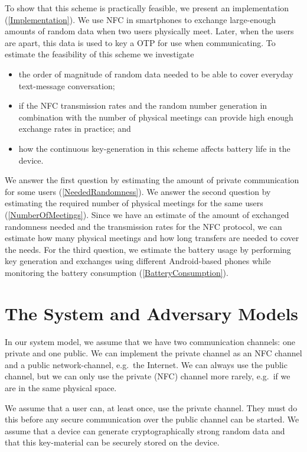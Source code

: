To show that this scheme is practically feasible, we present an implementation 
(\cref{Implementation}).
We use \ac{NFC} in smartphones to exchange large-enough amounts of random data 
when two users physically meet.
Later, when the users are apart, this data is used to key a \ac{OTP} for use 
when communicating.
To estimate the feasibility of this scheme we investigate
\begin{itemize}
  \item the order of magnitude of random data needed to be able to cover 
    everyday text-message conversation;

  \item if the \ac{NFC} transmission rates and the random number generation in 
    combination with the number of physical meetings can provide high enough 
    exchange rates in practice; and

  \item how the continuous key-generation in this scheme affects battery life 
    in the device.
\end{itemize}

We answer the first question by estimating the amount of private communication 
for some users (\cref{NeededRandomness}).
We answer the second question by estimating the required number of physical 
meetings for the same users (\cref{NumberOfMeetings}).
Since we have an estimate of the amount of exchanged randomness needed and the 
transmission rates for the \ac{NFC} protocol, we can estimate how many physical 
meetings and how long transfers are needed to cover the needs.
For the third question, we estimate the battery usage by performing key 
generation and exchanges using different Android-based phones while monitoring 
the battery consumption (\cref{BatteryConsumption}).


\section{The System and Adversary Models}
\label{ModelsOverview}

In our system model, we assume that we have two communication channels: one 
private and one public.
We can implement the private channel as an \ac{NFC} channel and a public 
network-channel, e.g.\ the Internet.
We can always use the public channel, but we can only use the private 
(\ac{NFC}) channel more rarely, e.g.\ if we are in the same physical space.

We assume that a user can, at least once, use the private channel.
They must do this before any secure communication over the public channel can 
be started.
We assume that a device can generate cryptographically strong random data and 
that this key-material can be securely stored on the device.


